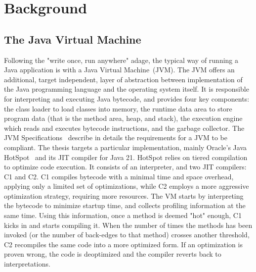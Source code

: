 \chapter{Background}


\section{The Java Virtual Machine}
Following the "write once, run anywhere" adage, the typical way of running a Java application is with a Java Virtual Machine~(JVM).
The JVM offers an additional, target independent, layer of abstraction between implementation of the Java programming language and the operating system itself.
It is responsible for interpreting and executing Java bytecode, and provides four key components: 
the class loader to load classes into memory, the runtime data area to store program data (that is the method area, heap, and stack), the execution engine which reads and executes bytecode instructions, and the garbage collector. The JVM Specifications~\cite{noauthor_java_nodate-1} describe in details the requirements for a JVM to be compliant. 
The thesis targets a particular implementation, mainly Oracle's Java HotSpot~\cite{noauthor_hotspot_nodate} and its JIT compiler for Java 21. 
HotSpot relies on tiered compilation to optimize code execution. It consists of an interpreter, and two JIT compilers: C1 and C2. 
C1 compiles bytecode with a minimal time and space overhead, applying only a limited set of optimizations, while C2 employs a more aggressive optimization strategy, requiring more resources.
The VM starts by interpreting the bytecode to minimize startup time, and collects profiling information at the same time. Using this information, once a method is deemed "hot" enough, C1 kicks in and starts compiling it. When the number of times the methods has been invoked (or the number of back-edges to that method) crosses another threshold, C2 recompiles the same code into a more optimized form. If an optimization is proven wrong, the code is deoptimized and the compiler reverts back to interpretations.  

